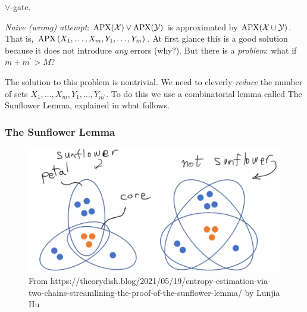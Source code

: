  







$\lor$-gate.

\textit{Naive (wrong) attempt}: $\operatorname{\mathrm{APX}}(\mathcal X)
\lor \operatorname{\mathrm{APX}}(\mathcal Y)$ is approximated by $\operatorname{\mathrm{APX}}(\mathcal X \cup \mathcal Y)$. That is, $\operatorname{\mathrm{APX}}\left(X_1, \ldots, X_m, Y_1, \ldots, Y_m\right)$. At first glance this is a good solution because it does not introduce \emph{any} errors (why?). But there is a \textit{problem}: what if $m+m^{\prime}>M$?


The solution to this problem is nontrivial. We need to cleverly \emph{reduce} the number of sets $X_1, \ldots, X_m, Y_1, \ldots, Y_{m^{\prime}}$. To do this we use a combinatorial lemma called The Sunflower Lemma, explained in what follows. 

\subsubsection{The Sunflower Lemma}

\begin{figure}
    \centering
        \includegraphics[width=0.75\linewidth]{images/sunflower-lemma.png}
    \caption{From https://theorydish.blog/2021/05/19/entropy-estimation-via-two-chains-streamlining-the-proof-of-the-sunflower-lemma/ by Lunjia Hu}
    \label{fig:enter-label}
\end{figure}




